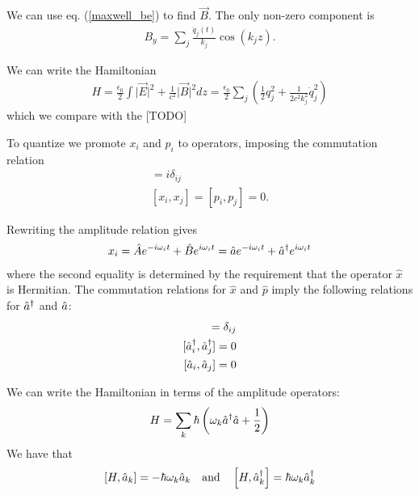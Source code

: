We can use eq. (\ref{maxwell_be}) to find $\vec{B}$. The only non-zero component is
\begin{align}
  B_y = \sum_j \frac{\dot{q}_j(t)}{k_j}\cos(k_j z).
\end{align}

We can write the Hamiltonian 
\begin{align}
  H = \frac{\epsilon_0}{2} \int \vert \vec{E}\vert^2 + \frac{1}{c^2}\vert\vec{B}\vert^2 dz 
  = \frac{\epsilon_0}{2} \sum_j \left(\frac{1}{2} q_j^2 + \frac{1}{2c^2k_j^2} \dot{q}_j^2\right)
\end{align}
which we compare with the [TODO]

To quantize we promote $x_i$ and $p_i$ to operators, imposing the commutation relation
\begin{align}
  [x_i, p_j] = i\delta_{ij} \\
  [x_i, x_j] = [p_i, p_j] = 0.
\end{align}

Rewriting the amplitude relation gives
\begin{align}
  x_i = \hat{A}e^{-i\omega_i t} + \hat{B} e^{i\omega_i t} =  \hat{a}e^{-i\omega_i t} + \hat{a}^\dagger e^{i\omega_i t}
\end{align}
where the second equality is determined by the requirement that the operator $\hat{x}$ is Hermitian. The commutation relations for $\hat{x}$ and $\hat{p}$ imply the following relations for $\hat{a}^\dagger$ and $\hat{a}$:
\begin{align}
  [\cre{a}_i, \an{a}_j] = \delta_{ij} \\
  [\cre{a}_i, \cre{a}_j] = 0 \\
  [\an{a}_i, \an{a}_j] = 0
\end{align}

We can write the Hamiltonian in terms of the amplitude operators:
\begin{align}
  H = \sum_k \hbar \left( \omega_k \hat{a}^\dagger\hat{a} +\frac{1}{2} \right)
\end{align}
We have that
\begin{align}
  \left[H, \hat{a}_k\right] = -\hbar \omega_k \hat{a}_k
  \quad \text{and} \quad 
  \left[H, \hat{a}^\dagger_k\right] = \hbar \omega_k \hat{a}^\dagger_k
\end{align}

